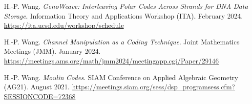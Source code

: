 \documentclass{article}
\def\sec#1{\vskip1em\textbf{\fs1#1}}
\def\fs#1{%
        \pgfmathsetmacro\a{#1}%
        \pgfmathsetmacro\A{\parskip*(4/3)^\a}%
        \pgfmathsetmacro\B{\A*(4/3)}%
        \fontsize{\A pt}{\B pt}\selectfont%
    }
\def\newtoold{\mdseries (new to old)}
\begin{document}
\bgroup
\def\section#1#2{\sec{Invited Talks \newtoold}}
\begin{thebibliography}{T9}
    H.-P. Wang.
    \emph{GenoWeave: Interleaving Polar Codes Across Strands for DNA Data Storage}.
    Information Theory and Applications Workshop (ITA).
    February 2024.
    \url{https://ita.ucsd.edu/workshop/schedule}

    H.-P. Wang.
    \emph{Channel Manipulation as a Coding Technique}.
    Joint Mathematics Meetings (JMM).
    January 2024.
    \url{https://meetings.ams.org/math/jmm2024/meetingapp.cgi/Paper/29146}

    H.-P. Wang.
    \emph{Moulin Codes}.
    SIAM Conference on Applied Algebraic Geometry (AG21).
    August 2021.
    \url{https://meetings.siam.org/sess/dsp_programsess.cfm?SESSIONCODE=72368}
\end{thebibliography}
\egroup
\end{document}
